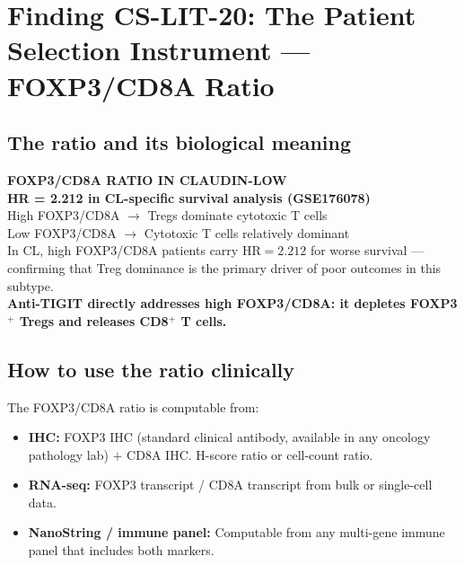 \documentclass[12pt, a4paper]{article}
\begin{document}
\section{Finding CS-LIT-20: The Patient Selection
Instrument --- FOXP3/CD8A Ratio}

\subsection{The ratio and its biological meaning}

\begin{center}
\colorbox{statbox}{
\begin{minipage}{0.88\textwidth}
\vspace{0.5em}
\centering
\textbf{FOXP3/CD8A RATIO IN CLAUDIN-LOW}\\[0.5em]
\textbf{HR = 2.212 in CL-specific survival analysis
(GSE176078)}\\[0.4em]
High FOXP3/CD8A $\rightarrow$ Tregs dominate
cytotoxic T cells\\
Low FOXP3/CD8A $\rightarrow$ Cytotoxic T cells
relatively dominant\\[0.3em]
In CL, high FOXP3/CD8A patients carry HR$=2.212$
for worse survival --- confirming that Treg
dominance is the primary driver of poor outcomes
in this subtype.\\[0.3em]
\textbf{Anti-TIGIT directly addresses high
FOXP3/CD8A: it depletes FOXP3$^+$ Tregs and
releases CD8$^+$ T cells.}
\vspace{0.5em}
\end{minipage}}
\end{center}

\subsection{How to use the ratio clinically}

The FOXP3/CD8A ratio is computable from:
\begin{itemize}
    \item \textbf{IHC:} FOXP3 IHC (standard clinical
    antibody, available in any oncology pathology lab)
    $+$ CD8A IHC. H-score ratio or cell-count ratio.
    \item \textbf{RNA-seq:} FOXP3 transcript /
    CD8A transcript from bulk or single-cell data.
    \item \textbf{NanoString / immune panel:}
    Computable from any multi-gene immune panel
    that includes both markers.
\end{itemize}
\end{document}
